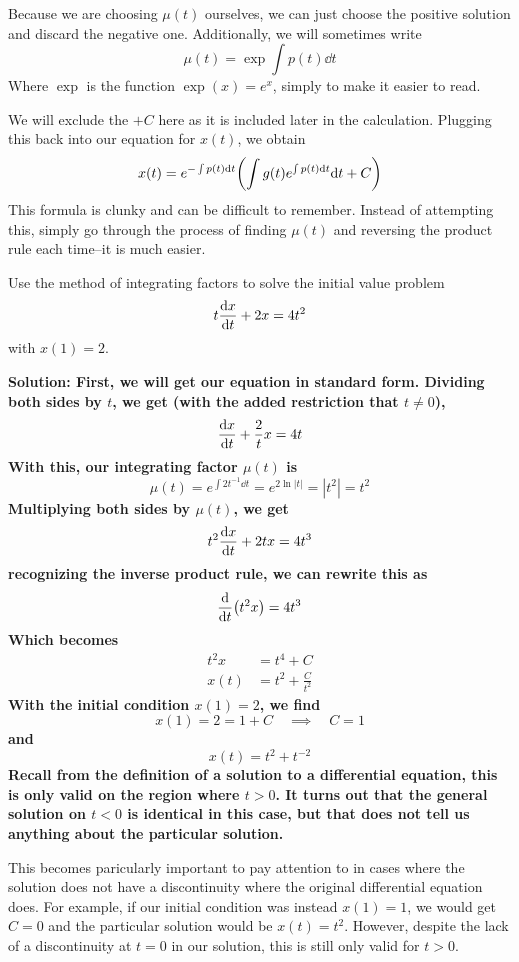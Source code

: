 Because we are choosing $\mu(t)$ ourselves, we can just choose the positive solution and discard the negative one. Additionally, we will sometimes write 
\[ \mu(t) = \exp \int p(t)\dd t\]
Where $\exp$ is the function $\exp(x) = e^x$, simply to make it easier to read. \par
We will exclude the $+C$ here as it is included later in the calculation. Plugging this back into our equation for $x(t)$, we obtain
\[ x(t) = e^{-\int p(t)\dd t}\pqty{\int g(t) e^{\int p(t)\dd t}\dd t + C}\]
This formula is clunky and can be difficult to remember. Instead of attempting this, simply go through the process of finding $\mu(t)$ and reversing the product rule each time--it is much easier.
\begin{example}
    Use the method of integrating factors to solve the initial value problem
    \[ t\dv{x}{t} + 2x = 4t^2 \]
    with $x(1) = 2$. \par
    \bf{Solution:} First, we will get our equation in standard form. Dividing both sides by $t$, we get (with the added restriction that $t\neq 0$), 
    \[ \dv{x}{t} + \frac{2}{t}x = 4t \]
    With this, our integrating factor $\mu(t)$ is
    \[ \mu(t) = e^{\int 2t^{-1}\dd t} = e^{2\ln|t|} = |t^2| = t^2\] 
    Multiplying both sides by $\mu(t)$, we get
    \[ t^2\dv{x}{t} + 2tx = 4t^3 \]
    recognizing the inverse product rule, we can rewrite this as
    \[ \dv{t} \pqty{t^2x} = 4t^3\]
    Which becomes
    \begin{align*}
        t^2x &= t^4 + C \\
        x(t) &= t^2 + \frac{C}{t^2}
    \end{align*}
    With the initial condition $x(1)=2$, we find
    \[ x(1) = 2 = 1 + C \quad \implies \quad C = 1\]
    and
    \[ x(t) = t^2 + t^{-2}\] 
    Recall from the definition of a solution to a differential equation, this is only valid on the region where $t>0$. It turns out that the general solution on $t<0$ is identical in this case, but that does not tell us anything about the particular solution. \par
    This becomes paricularly important to pay attention to in cases where the solution does not have a discontinuity where the original differential equation does. For example, if our initial condition was instead $x(1) = 1$, we would get $C=0$ and the particular solution would be $x(t) = t^2$. However, despite the lack of a discontinuity at $t=0$ in our solution, this is still only valid for $t>0$.
\end{example}
